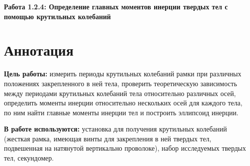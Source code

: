 \begin{center}
   \Large{\textbf{Работа 1.2.4: Определение главных моментов инерции твердых тел с помощью крутильных колебаний}}
\end{center}
\section{Аннотация}
\textbf{Цель работы:}  измерить периоды крутильных колебаний рамки при
различных положениях закрепленного в ней тела, проверить теоретическую зависимость между периодами крутильных колебаний тела
относительно различных осей, определить моменты инерции относительно нескольких осей для каждого тела, по ним найти главные
моменты инерции тел и построить эллипсоид инерции.

\textbf{В работе используются:} установка для получения крутильных
колебаний (жесткая рамка, имеющая винты для закрепления в ней
твердых тел, подвешенная на натянутой вертикально проволоке), набор исследуемых твердых тел, секундомер.

